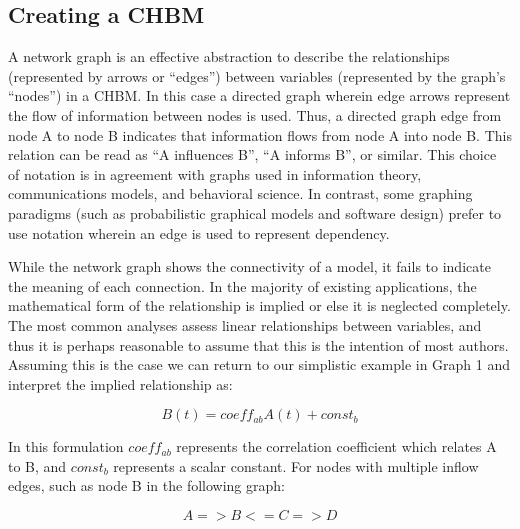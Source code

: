\documentclass[runningheads,a4paper]{llncs}
\begin{document}
\subsection{Creating a CHBM}
A network graph is an effective abstraction to describe the relationships (represented by arrows or ``edges'') between variables (represented by the graph's ``nodes'') in a CHBM.
In this case a directed graph wherein edge arrows represent the flow of information between nodes is used.
Thus, a directed graph edge from node A to node B indicates that information flows from node A into node B. 
%
%
This relation can be read as ``A influences B'', ``A informs B'', or similar.  
This choice of notation is in agreement with graphs used in information theory, communications models, and behavioral science.
In contrast, some graphing paradigms (such as probabilistic graphical models and software design) prefer to use notation wherein an edge is used to represent dependency.

While the network graph shows the connectivity of a model, it fails to indicate the meaning of each connection.
In the majority of existing applications, the mathematical form of the relationship is implied or else it is neglected completely.
The most common analyses assess linear relationships between variables, and thus it is perhaps reasonable to assume that this is the intention of most authors.
Assuming this is the case we can return to our simplistic example in Graph 1 and interpret the implied relationship as:

\begin{equation}
    B(t) = coeff_{ab}A(t) + const_b
    \label{eq:linear-formula}
\end{equation}

In this formulation $coeff_{ab}$ represents the correlation coefficient which relates A to B, and $const_b$ represents a scalar constant.
For nodes with multiple inflow edges, such as node B in the following graph:

\begin{equation}
    A => B <= C => D
    \label{eq:less-simple-graph}
\end{equation}
\end{document}
